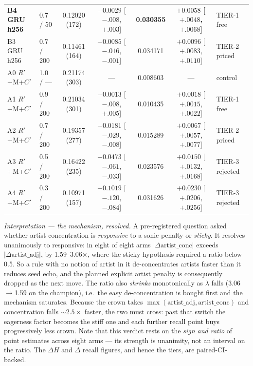 \documentclass[11pt]{article}
\newcommand{\best}[1]{\textbf{#1}}
\newcommand{\Rp}{\ensuremath{R'}}
\newcommand{\Cp}{\ensuremath{C'}}
\begin{document}
\begin{table}[ht]
{\begin{tabular}{llccccl}
    \best{B4 GRU h256} & 0.7 / 50 & 0.12020 (172) & $-0.0029$ [$-.008$, $+.003$] & \best{0.030355} & \best{$+0.0058$ [$+.0048$, $+.0068$]} & TIER-1 free \\
    B3 GRU h256 & 0.7 / 200 & 0.11461 (164) & $-0.0085$ [$-.016$, $-.001$] & 0.034171 & $+0.0096$ [$+.0083$, $+.0110$] & TIER-2 priced \\
    \midrule
    A0 \Rp+M+\Cp & 1.0 / --- & 0.21174 (303) & --- & 0.008603 & --- & control \\
    A1 \Rp+M+\Cp & 0.9 / 200 & 0.21034 (301) & $-0.0013$ [$-.008$, $+.005$] & 0.010435 & $+0.0018$ [$+.0015$, $+.0022$] & TIER-1 free \\
    A2 \Rp+M+\Cp & 0.7 / 200 & 0.19357 (277) & $-0.0181$ [$-.029$, $-.008$] & 0.015289 & $+0.0067$ [$+.0057$, $+.0077$] & TIER-2 priced \\
    A3 \Rp+M+\Cp & 0.5 / 200 & 0.16422 (235) & $-0.0473$ [$-.061$, $-.033$] & 0.023576 & $+0.0150$ [$+.0132$, $+.0168$] & TIER-3 rejected \\
    A4 \Rp+M+\Cp & 0.3 / 200 & 0.10971 (157) & $-0.1019$ [$-.120$, $-.084$] & 0.031626 & $+0.0230$ [$+.0206$, $+.0256$] & TIER-3 rejected \\
    \bottomrule
  \end{tabular}}
\end{table}

\emph{Interpretation --- the mechanism, resolved.} A pre-registered question
asked whether artist concentration is \emph{responsive} to a sonic penalty or
\emph{sticky}. It resolves unanimously to responsive: in eight of eight arms
$|\Delta\text{artist\_conc}|$ exceeds $|\Delta\text{artist\_adj}|$, by
\numrange{1.59}{3.06}$\times$, where the sticky hypothesis required a ratio
below \num{0.5}. So a rule with no notion of artist in it de-concentrates artists
faster than it reduces seed echo, and the planned explicit artist penalty is
consequently dropped as the next move. The ratio also \emph{shrinks}
monotonically as $\lambda$ falls (\num{3.06}$\to$\num{1.59} on the champion),
i.e.\ the easy de-concentration is bought first and the mechanism saturates.
Because the crown takes $\max(\text{artist\_adj},\text{artist\_conc})$ and
concentration falls ${\sim}2.5\times$ faster, the two must cross: past that
switch the eagerness factor becomes the stiff one and each further recall point
buys progressively less crown. Note that this verdict rests on the \emph{sign
and ratio} of point estimates across eight arms --- its strength is unanimity,
not an interval on the ratio. The $\Delta H$ and $\Delta$ recall figures, and
hence the tiers, are paired-CI-backed.
\end{document}
